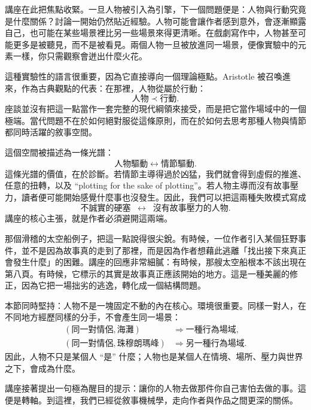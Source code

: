 講座在此把焦點收緊。一旦人物被引入為引擎，下一個問題便是：人物與行動究竟是什麼關係？討論一開始仍然貼近經驗。人物可能會讓作者感到意外，會逐漸顯露自己，也可能在某些場景裡比另一些場景來得更清晰。在戲劇寫作中，人物甚至可能更多是被聽見，而不是被看見。兩個人物一旦被放進同一場景，便像實驗中的元素一樣，你只需觀察會迸出什麼火花。

這種實驗性的語言很重要，因為它直接導向一個理論極點。Aristotle 被召喚進來，作為古典觀點的代表：在那裡，人物從屬於行動：
\begin{equation}
\text{人物} \prec \text{行動}.
\end{equation}
座談並沒有把這一點當作一套完整的現代綱領來接受，而是把它當作場域中的一個極端。當代問題不在於如何絕對服從這條原則，而在於如何去思考那種人物與情節都同時活躍的敘事空間。

這個空間被描述為一條光譜：
\begin{equation}
\text{人物驅動} \leftrightarrow \text{情節驅動}.
\end{equation}
這條光譜的價值，在於診斷。若情節主導得過於凶猛，我們就會得到虛假的推進、任意的扭轉，以及 ``plotting for the sake of plotting''。若人物主導而沒有故事壓力，讀者便可能開始感覺什麼事也沒發生。因此，我們可以把這兩種失敗模式寫成
\begin{equation}
\text{不誠實的硬塞} \;\;\leftrightarrow\;\; \text{沒有故事壓力的人物}.
\end{equation}
講座的核心主張，就是作者必須避開這兩端。

那個滑稽的太空船例子，把這一點說得很尖銳。有時候，一位作者引入某個狂野事件，並不是因為故事真的走到了那裡，而是因為作者想藉此逃離「找出接下來真正會發生什麼」的困難。講座的回應非常細膩：有時候，那艘太空船根本不該出現在第八頁。有時候，它標示的其實是故事真正應該開始的地方。這是一種美麗的修正，因為它把一場拙劣的逃逸，轉化成一個結構問題。

本節同時堅持：人物不是一塊固定不動的內在核心。環境很重要。同樣一對人，在不同地方經歷同樣的分手，不會產生同一場景：
\begin{align}
(\text{同一對情侶},\text{海灘}) &\Rightarrow \text{一種行為場域},\\
(\text{同一對情侶},\text{珠穆朗瑪峰}) &\Rightarrow \text{另一種行為場域}.
\end{align}
因此，人物不只是某個人 ``是'' 什麼；人物也是某個人在情境、場所、壓力與世界之下，會成為什麼。

講座接著提出一句極為醒目的提示：讓你的人物去做那件你自己害怕去做的事。這便是轉軸。到這裡，我們已經從敘事機械學，走向作者與作品之間更深的關係。

